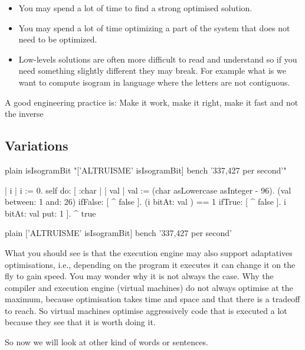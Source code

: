 \documentclass[10pt,twoside,english]{_support/latex/sbabook/sbabook}
\begin{document}
\begin{itemize}
\item You may spend a lot of time to find a strong optimised solution. 
\item You may spend a lot of time optimizing a part of the system that does not need to be optimized.
\item Low-levels solutions are often more difficult to read and understand so if you need something slightly different they may break. For example what is we want to compute isogram in language where the letters are not contiguous.
\end{itemize}

\begin{important}
A good engineering practice is: Make it work, make it right, make it fast and not the inverse
\end{important}
\subsection{Variations}
\begin{displaycode}{plain}
isIsogramBit
	"['ALTRUISME' isIsogramBit] bench '337,427 per second'"

   | i |
   i := 0.
   self do: [ :char |
         | val |
         val := (char asLowercase asInteger - 96).
         (val between: 1 and: 26) ifFalse: [ ^ false ].
         (i bitAt: val ) == 1 ifTrue: [ ^ false ].
         i bitAt: val put: 1
         ].
     ^ true
\end{displaycode}

\begin{displaycode}{plain}
['ALTRUISME' isIsogramBit] bench '337,427 per second'
\end{displaycode}

What you should see is that the execution engine may also support adaptatives optimisations, i.e., depending on the program it executes it can change it on the fly to gain speed. You may wonder why it is not always the case. 
Why the compiler and execution engine (virtual machines) do not always optimise at the maximum, because optimisation takes time and space and that there is a tradeoff to reach. So virtual machines optimise aggressively code that is executed a lot because they see that it is worth doing it. 

So now we will look at other kind of words or sentences. 


\backmatter



\end{document}
